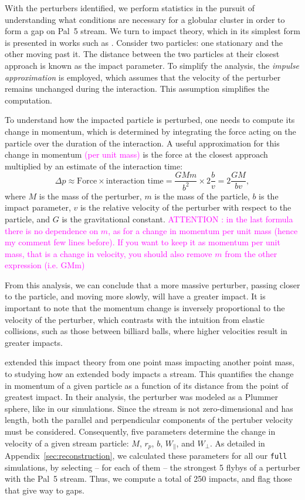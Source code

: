 \documentclass[draft]{aa}
\newcommand{\paola}[1]{\textcolor{magenta}{{#1}}}
\begin{document}
    With the perturbers identified, we perform statistics in the pursuit of understanding what conditions are necessary for a globular cluster  in order to form a gap on Pal~5 stream. We turn to impact theory, which in its simplest form is presented in works such as \citet{2008gady.book.....B}. Consider two particles: one stationary and the other moving past it. The distance between the two particles at their closest approach is known as the impact parameter. To simplify the analysis, the \textit{impulse approximation} is employed, which assumes that the velocity of the perturber remains unchanged during the interaction. This assumption simplifies the computation.

    To understand how the impacted particle is perturbed, one needs to compute its change in momentum, which is determined by integrating the force acting on the particle over the duration of the interaction. A useful approximation for this change in momentum \paola{(per unit mass)} is the force at the closest approach multiplied by an estimate of the interaction time:
    \begin{equation} \label{eq:change_in_momentum} \Delta p \approx \text{Force} \times \text{interaction time} = \frac{GMm}{b^2} \times 2\frac{b}{v} = 2\frac{GM}{bv}, \end{equation}where $M$ is the mass of the perturber, $m$ is the mass of the particle, $b$ is the impact parameter, $v$ is the relative velocity of the perturber with respect to the particle, and $G$ is the gravitational constant. \paola{ATTENTION : in the last formula there is no dependence on $m$, as  for a change in momentum per unit mass (hence my comment few lines before). If you want to keep it as momentum per unit mass, that is a change in velocity, you should also remove $m$ from the other expression (i.e. GMm)}


    From this analysis, we can conclude that a more massive perturber, passing closer to the particle, and moving more slowly, will have a greater impact. It is important to note that the momentum change is inversely proportional to the velocity of the perturber, which contrasts with the intuition from elastic collisions, such as those between billiard balls, where higher velocities result in greater impacts.

    \citet{2015MNRAS.450.1136E} extended this impact theory from one point mass impacting another point mass, to studying how an extended body impacts a stream. This quantifies the change in momentum of a given particle as a function of its distance from the point of greatest impact. In their analysis, the perturber was modeled as a Plummer sphere, like in our simulations. Since the stream is not zero-dimensional and has length, both the parallel and perpendicular components of the pertuber velocity must be considered. Consequently, five parameters determine the change in velocity of a given stream particle: $M$, $r_p$, $b$, $W_\parallel$, and $W_\perp$. As detailed in Appendix~\ref{sec:reconstruction}, we calculated these parameters for all our \texttt{full} simulations, by selecting -- for each of them --  the strongest 5 flybys of a perturber with the Pal~5 stream. Thus, we compute a total of  250 impacts, and flag those that give way to gaps. 
\end{document}
